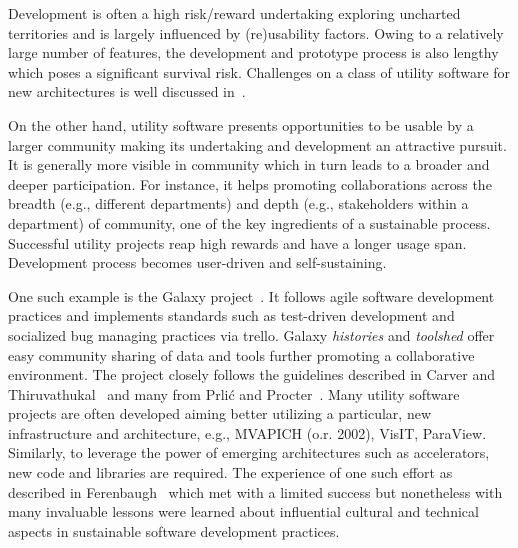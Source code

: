 \documentclass[11pt, oneside]{amsart}
\newcommand{\toolname}[1] {\textsf{#1}}
\begin{document}
Development is often a high risk/reward undertaking exploring
uncharted territories and is largely influenced by (re)usability
factors. Owing to a relatively large number of features, the development
and prototype process is also lengthy which poses a significant
survival risk. Challenges on a class of utility software for new
architectures is well discussed in~\cite{Ferenbaugh_WSSSPE}.

On the other hand, utility software presents opportunities to be usable by a
larger community making its undertaking and development an attractive pursuit.
It is generally more visible in community which in turn leads to a broader and
deeper participation. For instance, it helps promoting collaborations across
the breadth (e.g., different departments) and depth (e.g., stakeholders within
a department) of community, one of the key ingredients of a sustainable
process. Successful utility projects reap high rewards and have a longer usage
span. Development process becomes user-driven and self-sustaining.

One such example is the \toolname{Galaxy} project~\cite{Galaxy}. It follows
agile software development practices and implements standards such as
test-driven development and socialized bug managing practices via
\toolname{trello}. \toolname{Galaxy} \emph{histories} and \emph{toolshed} offer
easy community sharing of data and tools further promoting a collaborative
environment. The project closely follows the guidelines described in Carver and
Thiruvathukal~\cite{Carver_WSSSPE} and many from Prli\'{c} and
Procter~\cite{Prlic_WSSSPE}. Many utility software projects are often developed
aiming better utilizing a particular, new infrastructure and architecture,
e.g., \toolname{MVAPICH} (o.r. 2002), \toolname{VisIT}, \toolname{ParaView}. Similarly, to
leverage the power of emerging architectures such as accelerators, new code and
libraries are required. The experience of one such effort as described in
Ferenbaugh~\cite{Ferenbaugh_WSSSPE} which met with a limited success but
nonetheless with many invaluable lessons were learned about influential
cultural and technical aspects in sustainable software development practices.
\end{document}
